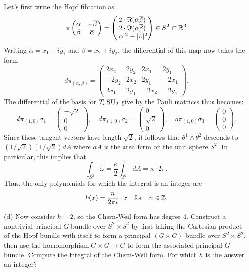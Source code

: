 \documentclass{../../templates/lkx_pset}
\begin{document}
\begin{parts}
	Let's first write the Hopf fibration as
	\[
		\pi\begin{pmatrix}\alpha & -\overline{\beta}\\ \beta & \overline{\alpha}\end{pmatrix} = \begin{pmatrix}2\cdot \Re(\alpha \overline{\beta}) \\ 2\cdot \Im(\alpha\overline{\beta}) \\ |\alpha|^2 - |\beta|^2\end{pmatrix}\in S^2\subset \mathbb{R}^3
	\]
	Writing $\alpha = x_1+iy_1$ and $\beta = x_2+iy_2$, the differential of this map now takes the form
	\[
		d\pi_{(\alpha,\beta)} = \begin{pmatrix}2x_2 & 2y_2 & 2x_1 & 2y_1 \\ -2y_2 & 2x_2 & 2y_1 & -2x_1 \\ 2x_1 & 2y_1 & -2x_2 & -2y_1\end{pmatrix}.
	\]
	The differential of the basis for $T_e\operatorname{SU}_2$ give by the Pauli matrices thus becomes:
	\[
		d\pi_{(1,0)} \sigma_1 = \begin{pmatrix}-\sqrt{2}\\0\\0\end{pmatrix},\quad
		d\pi_{(1,0)} \sigma_2 = \begin{pmatrix}0\\\sqrt{2}\\0\end{pmatrix},\quad
		d\pi_{(1,0)} \sigma_3 = \begin{pmatrix}0\\0\\0\end{pmatrix}.
	\]
	Since these tangent vectors have length $\sqrt{2}$, it follows that $\theta^1\wedge \theta^2$ descends to $(1/\sqrt{2})(1/\sqrt{2})dA$ where $dA$ is the area form on the unit sphere $S^2$. In particular, this implies that
	\[
		\int_{S^2} \widetilde{\omega} = \frac{\kappa}{2}\int_{S^2}dA = \kappa\cdot 2\pi.
	\]
	Thus, the only polynomials for which the integral is an integer are
	\[
		h(x) = \frac{n}{2\pi i}\cdot x\quad \textrm{for} \quad n\in \mathbb{Z}.
	\]

	\begin{part}{(d)}
		Now consider $k=2$, so the Chern-Weil form has degree $4$. Construct a nontrivial principal $G$-bundle over $S^2\times S^2$ by first taking the Cartesian product of the Hopf bundle with itself to form a principal $(G\times G)$-bundle over $S^2\times S^2$, then use the homomorphism $G\times G\to G$ to form the associated principal $G$-bundle. Compute the integral of the Chern-Weil form. For which $h$ is the answer an integer?
	\end{part}


\end{parts}
\end{document}
